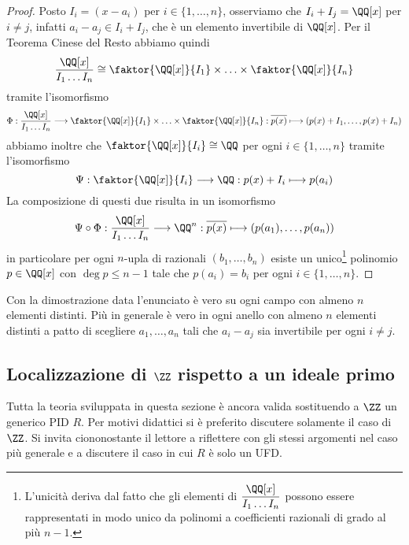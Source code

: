 \documentclass[11pt]{scrartcl}
\begin{document}
	\begin{proof}
		Posto $I_i = (x - a_i)$ per $i \in \{1, \ldots, n\}$, osserviamo che 
		$I_i + I_j = \QQ[x]$ per $i \neq j$, infatti $a_i - a_j \in I_i + I_j$, 
		che è un elemento invertibile di $\QQ[x]$. Per il Teorema Cinese del Resto
		abbiamo quindi
		\[
		\frac{\QQ[x]}{I_1\ldots I_n} \cong \faktor{\QQ[x]}{I_1}\times 
		\ldots \times \faktor{\QQ[x]}{I_n}
		\]
		tramite l'isomorfismo
		\[
		\Phi: \frac{\QQ[x]}{I_1\ldots I_n} \longrightarrow \faktor{\QQ[x]}{I_1}\times 
		\ldots \times \faktor{\QQ[x]}{I_n}: \overline{p(x)}\longmapsto
		(p(x) + I_1, \ldots, p(x) + I_n)
		\]
		abbiamo inoltre che $\faktor{\QQ[x]}{I_i} \cong \QQ$ per ogni $i \in \{1, \ldots, n\}$
		tramite l'isomorfismo
		\[
		\Psi: \faktor{\QQ[x]}{I_i} \longrightarrow \QQ: p(x) + I_i \longmapsto p(a_i)
		\]
		La composizione di questi due risulta in un isomorfismo
		\[
		\Psi\circ\Phi: \frac{\QQ[x]}{I_1\ldots I_n}\longrightarrow \QQ^n:
		\overline{p(x)}\longmapsto (p(a_1), \ldots, p(a_n))
		\]
		in particolare per ogni $n$-upla di razionali $(b_1, \ldots, b_n)$ esiste
		un unico\footnote{
			L'unicità deriva dal fatto che gli elementi di $\displaystyle\frac{\QQ[x]}{I_1\ldots I_n}$
			possono essere rappresentati in modo unico da polinomi a coefficienti 
			razionali di grado al più $n - 1$.
		} polinomio $p \in \QQ[x]$ con $\deg p \leq n - 1$ tale che 
		$p(a_i) = b_i$ per ogni $i \in \{1, \ldots, n\}$.
	\end{proof}
	
	\begin{remark}
		Con la dimostrazione data l'enunciato è vero su ogni campo con almeno 
		$n$ elementi distinti. Più in generale è vero in ogni anello con almeno $n$
		elementi distinti a patto di scegliere $a_1, \ldots, a_n$ tali che $a_i - a_j$
		sia invertibile per ogni $i \neq j$.
	\end{remark}
	
	\newpage
	
	\subsection{Localizzazione di \texorpdfstring{$\ZZ$}{ℤ} rispetto a un ideale primo}

	\begin{premessa*}
		Tutta la teoria sviluppata in questa sezione è ancora valida sostituendo a
		$\ZZ$ un generico PID $R$. Per motivi didattici si è preferito discutere
		solamente il caso di $\ZZ$. Si invita ciononostante il lettore a
		riflettere con gli stessi argomenti nel caso più generale e a discutere
		il caso in cui $R$ è solo un UFD.
	\end{premessa*}
\end{document}
